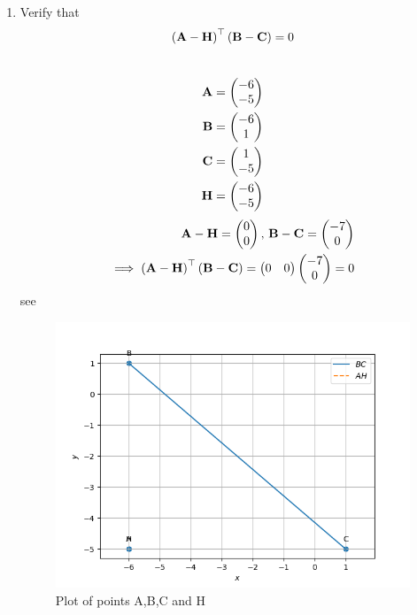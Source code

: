 \documentclass[11pt]{book}
\begin{document}
\begin{enumerate}[label=\thesection.\arabic*.,ref=\thesection.\theenumi]
\item Verify that 
		\begin{align}
			\left(\mathbf{A}-\mathbf{H}\right)^{\top}\left(\mathbf{B}-\mathbf{C}\right) = 0
		\end{align}
\\  \solution
 \begin{align} 
 \mathbf{A} &= \begin{pmatrix} -6\\ -5 \end{pmatrix} \\ 
 \mathbf{B} &= \begin{pmatrix} -6\\ 1 \end{pmatrix}
  \\\mathbf{C} &= \begin{pmatrix} 1\\ -5\end{pmatrix} \\ 
  \mathbf{H} &=\begin{pmatrix}{-6}\\{-5}\end{pmatrix}
 \end{align}
\begin{align}
\mathbf{A}-\mathbf{H}=\begin{pmatrix}{0}\\{0}\end{pmatrix},\,
\mathbf{B}-\mathbf{C}=\begin{pmatrix}-7\\0\end{pmatrix}
\\
	\implies \left(\mathbf{A}-\mathbf{H}\right)^{\top}\left(\mathbf{B}-\mathbf{C}\right)=\begin{pmatrix}0 & 0\end{pmatrix}
\begin{pmatrix}-7\\0\end{pmatrix}
=0
\end{align}
see 
\begin{figure}
    \centering
    \includegraphics{figs/ABCH.png}
    \caption{Plot of points A,B,C and H}
    \label{fig:Pts_ABCH}
\end{figure}



\end{enumerate}
\end{document}
